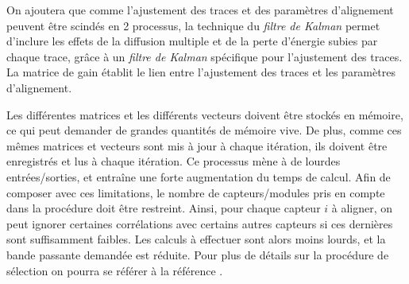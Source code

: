 \begin{appendices}
   On ajoutera que comme l'ajustement des traces et des param\`etres d'alignement peuvent \^etre scind\'es en 2 processus, la technique du \textit{filtre de Kalman} permet d'inclure les effets de la diffusion multiple et de la perte d'énergie subies par chaque trace, grâce \`a un \textit{filtre de Kalman} sp\'ecifique pour l'ajustement des traces. La matrice de gain \'etablit le lien entre l'ajustement des traces et les param\`etres d'alignement.
   
   \medskip
   
   Les diff\'erentes matrices et les diff\'erents vecteurs doivent \^etre stock\'es en m\'emoire, ce qui peut demander de grandes quantit\'es de m\'emoire vive. De plus, comme ces m\^emes matrices et vecteurs sont mis \`a jour \`a chaque it\'eration, ils doivent \^etre enregistr\'es et lus \`a chaque it\'eration. Ce processus m\`ene \`a de lourdes entr\'ees/sorties, et entraîne une forte augmentation du temps de calcul. Afin de composer avec ces limitations, le nombre de capteurs/modules pris en compte dans la proc\'edure doit \^etre restreint. Ainsi, pour chaque capteur $i$ \`a aligner, on peut ignorer certaines corrélations avec certains autres capteurs si ces derni\`eres sont suffisamment faibles. Les calculs \`a effectuer sont alors moins lourds, et la bande passante demand\'ee est r\'eduite. Pour plus de d\'etails sur la proc\'edure de sélection on pourra se r\'ef\'erer \`a la r\'ef\'erence \cite{Widl:2006mz}.   
   
   \medskip
   

\end{appendices}
